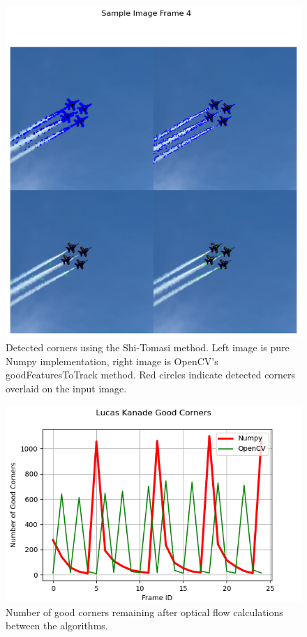 \documentclass[11pt, conference, letterpaper]{IEEEtran}
\begin{document}
\onecolumn
\begin{figure}[h]
    \centering
    \includegraphics[width=0.5\linewidth]{images/sample_image_4.png}
    \caption{Detected corners using the Shi-Tomasi method. Left image is pure Numpy implementation, right image is OpenCV's goodFeaturesToTrack method. Red circles indicate detected corners overlaid on the input image.}
    \label{fig:sample_5}
\end{figure}
\twocolumn

\begin{figure}[t]
    \centering
    \includegraphics[width=0.9\linewidth]{images/lk_good_corners.png}
    \caption{Number of good corners remaining after optical flow calculations between the algorithms.}
    \label{fig:lk-corners}
\end{figure}
\end{document}

